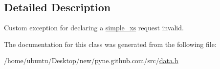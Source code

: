 \subsection{Detailed Description}
Custom exception for declaring a \hyperlink{structsimple__xs}{simple\+\_\+xs} request invalid. 

The documentation for this class was generated from the following file\+:\begin{DoxyCompactItemize}
\item 
/home/ubuntu/\+Desktop/new/pyne.\+github.\+com/src/\hyperlink{data_8h}{data.\+h}\end{DoxyCompactItemize}
